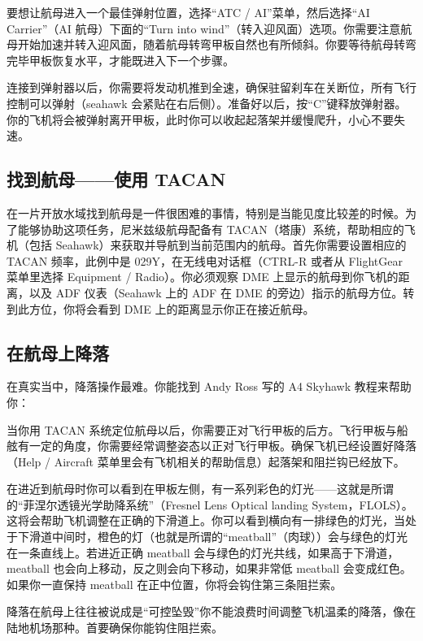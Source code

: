 要想让航母进入一个最佳弹射位置，选择“ATC / AI”菜单，然后选择“AI Carrier”（AI 航母）下面的“Turn into wind”（转入迎风面）选项。你需要注意航母开始加速并转入迎风面，随着航母转弯甲板自然也有所倾斜。你要等待航母转弯完毕甲板恢复水平，才能既进入下一个步骤。

连接到弹射器以后，你需要将发动机推到全速，确保驻留刹车在关断位，所有飞行控制可以弹射（seahawk 会紧贴在右后侧）。准备好以后，按“C”键释放弹射器。你的飞机将会被弹射离开甲板，此时你可以收起起落架并缓慢爬升，小心不要失速。

\subsection{找到航母——使用 TACAN}

在一片开放水域找到航母是一件很困难的事情，特别是当能见度比较差的时候。为了能够协助这项任务，尼米兹级航母配备有 TACAN（塔康）系统，帮助相应的飞机（包括 Seahawk）来获取并导航到当前范围内的航母。首先你需要设置相应的 TACAN 频率，此例中是 029Y，在无线电对话框（CTRL-R 或者从 FlightGear 菜单里选择 Equipment / Radio）。你必须观察 DME 上显示的航母到你飞机的距离，以及 ADF 仪表（Seahawk 上的 ADF 在 DME 的旁边）指示的航母方位。转到此方位，你将会看到 DME 上的距离显示你正在接近航母。

\subsection{在航母上降落}

在真实当中，降落操作最难。你能找到 Andy Ross 写的 A4 Skyhawk 教程来帮助你：

\noindent
{}

当你用 TACAN 系统定位航母以后，你需要正对飞行甲板的后方。飞行甲板与船舷有一定的角度，你需要经常调整姿态以正对飞行甲板。确保飞机已经设置好降落（Help / Aircraft 菜单里会有飞机相关的帮助信息）起落架和阻拦钩已经放下。

在进近到航母时你可以看到在甲板左侧，有一系列彩色的灯光——这就是所谓的“菲涅尔透镜光学助降系统”（Fresnel Lens Optical landing System，FLOLS）。这将会帮助飞机调整在正确的下滑道上。你可以看到横向有一排绿色的灯光，当处于下滑道中间时，橙色的灯（也就是所谓的“meatball”（肉球））会与绿色的灯光在一条直线上。若进近正确 meatball 会与绿色的灯光共线，如果高于下滑道，meatball 也会向上移动，反之则会向下移动，如果非常低 meatball 会变成红色。如果你一直保持 meatball 在正中位置，你将会钩住第三条阻拦索。

降落在航母上往往被说成是“可控坠毁”你不能浪费时间调整飞机温柔的降落，像在陆地机场那种。首要确保你能钩住阻拦索。

